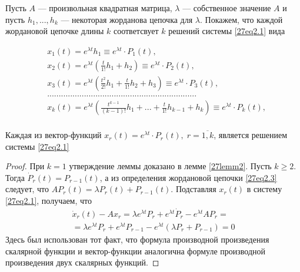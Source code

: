 Пусть $A$ --- произвольная квадратная матрица, $\lambda$ --- собственное значение $A$ и пусть $h_1,...,h_k$ --- некоторая жорданова цепочка для $\lambda$. Покажем, что каждой жордановой цепочке длины $k$ соответсвует $k$ решений системы \eqref{27eq2.1} вида

\begin{equation}\label{27eq2.4}
\begin{aligned}
&x_1(t)=e^{\lambda t}h_1\equiv e^{\lambda t}\cdot P_1(t),\\
&x_2(t)=e^{\lambda t}\left( \frac{t}{1!}h_1+h_2\right)\equiv e^{\lambda t}\cdot P_2(t),\\
&x_3(t)=e^{\lambda t}\left( \frac{t^2}{2!}h_1+\frac{t}{1!}h_2+h_3\right)\equiv e^{\lambda t}\cdot P_3(t),\\
&.................................................................\\
&x_k(t)=e^{\lambda t}\left(\frac{t^{k-1}}{(k-1)!}h_1+...+\frac{t}{1!}h_{k-1}+h_k\right)\equiv e^{\lambda t}\cdot P_k(t),\\
\end{aligned}
\end{equation}

\begin{lemm}\label{27lemm3}
Каждая из вектор-функций $x_r(t)=e^{\lambda t}\cdot P_r(t),\; r=\overline{1,k}$, является решением системы \eqref{27eq2.1}
\end{lemm}

\begin{proof}
При $k=1$ утверждение леммы доказано в лемме \ref{27lemm2}. Пусть $k\geq 2$. Тогда $\dot{P}_r(t)=P_{r-1}(t)$, а из определения жордановой цепочки \eqref{27eq2.3} следует, что $AP_r(t)=\lambda P_r(t)+P_{r-1}(t)$. Подставляя $x_r(t)$ в систему \eqref{27eq2.1}, получаем, что
\begin{multline*}
\dot{x}_r(t)-Ax_r=\lambda e^{\lambda t}P_r+e^{\lambda t}\dot{P}_r-e^{\lambda t}AP_r=\\=\lambda e^{\lambda t} P_r+e^{\lambda t}P_{r-1}-e^{\lambda t}(\lambda P_r+P_{r-1})=0
\end{multline*}
Здесь был использован тот факт, что формула производной произведения скалярной функции и вектор-функции аналогична формуле производной произведения двух скалярных функций.
\end{proof}


